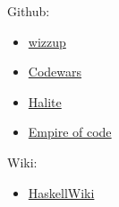 \documentclass{minimal}
\begin{document}
Github:

\begin{itemize}
  \item \href{https://github.com/wizzup}{wizzup}
  \item \href{https://github.com/Codewars/codewars-runner-cli/commits?author=wizzup}{Codewars}
  \item \href{https://github.com/HaliteChallenge/Halite/commits?author=wizzup}{Halite}
  \item \href{https://github.com/Empire-of-Code-Puzzles/checkio-empire-dailies-reports/commits?author=wizzup}{Empire of code}
\end{itemize}

Wiki:
\begin{itemize}
  \item \href{https://wiki.haskell.org/Special:Contributions/Wizzup}{HaskellWiki}
\end{itemize}
\end{document}
